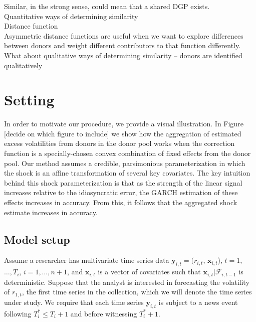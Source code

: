 \documentclass[11pt]{article}
\newcommand{\y}{\textbf{y}}
\newcommand{\x}{\textbf{x}}
\theoremstyle{definition}
\begin{document}
Similar, in the strong sense, could mean that a shared DGP exists.\\



Quantitative ways of determining similarity\\

Distance function\\

Asymmetric distance functions are useful when we want to explore differences between donors and weight different contributors to that function differently.\\

What about qualitative ways of determining similarity -- \cite{lundquist2024volatility} donors are identified qualitatively

\section{Setting}\label{Section}


In order to motivate our procedure, we provide a visual illustration.  In Figure [decide on which figure to include] %
we show how the aggregation of estimated excess volatilities from donors in the donor pool works when the correction function is a specially-chosen convex combination of fixed effects from the donor pool.  Our method assumes a credible, parsimonious parameterization in which the shock is an affine transformation of several key covariates.  The key intuition behind this shock parameterization is that as the strength of the linear signal increases relative to the idiosyncratic error, the GARCH estimation of these effects increases in accuracy.  From this, it follows that the aggregated shock estimate increases in accuracy.


\subsection{Model setup}
\label{modelsetup}
Assume a researcher has multivariate time series data $\y_{i,t} = (r_{i,t}$, $\x_{i,t}$), $t = 1,$ $\ldots,  T_i$, $i = 1, \ldots, n+1$, and  $\x_{i,t}$ is a vector of covariates such that $\x_{i,t}|\mathcal{F}_{i,t-1}$ is deterministic.  Suppose that the analyst is interested in forecasting the volatility of $r_{1,t}$, the first time series in the collection, which we will denote the time series under study.  We require that each time series $\y_{i,t}$ is subject to a news event following $T^*_i \leq T_{i} + 1$ and before witnessing $T^*_i+1$.  
\end{document}
